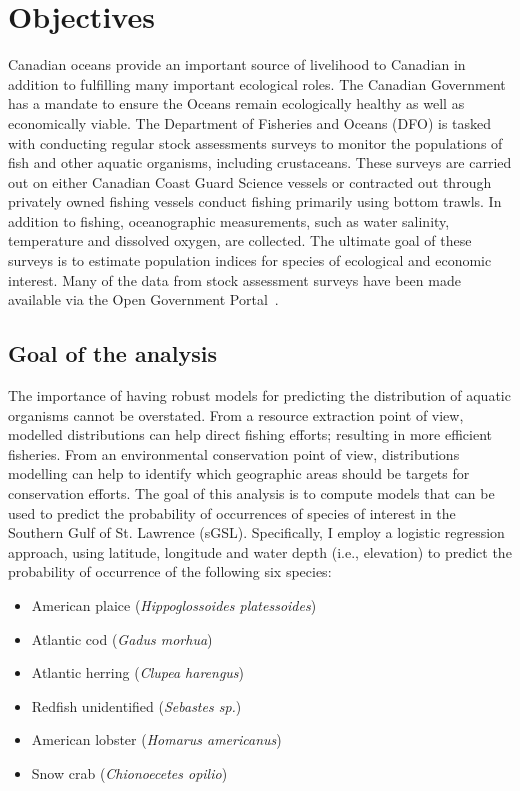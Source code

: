 \section{Objectives}

Canadian oceans provide an important source of livelihood to Canadian in addition to fulfilling many important ecological roles.
The Canadian Government has a mandate to ensure the Oceans remain ecologically healthy as well as economically viable.
The Department of Fisheries and Oceans (DFO) is tasked with conducting regular stock assessments surveys to monitor the populations of fish and other aquatic
organisms, including crustaceans.
These surveys are carried out on either Canadian Coast Guard Science vessels or contracted out through privately owned fishing vessels conduct fishing
primarily using bottom trawls. In addition to fishing, oceanographic measurements, such as water salinity, temperature and dissolved oxygen, are collected.
The ultimate goal of these surveys is to estimate population indices for species of ecological and economic interest.
Many of the data from stock assessment surveys have been made available via the Open Government Portal~\cite{ogp}.

\subsection{Goal of the analysis}

The importance of having robust models for predicting the distribution of aquatic organisms cannot be overstated.
From a resource extraction point of view, modelled distributions can help direct fishing efforts; resulting in more efficient fisheries.
From an environmental conservation point of view, distributions modelling can help to identify which geographic areas should be targets for
conservation efforts.
The goal of this analysis is to compute models that can be used to predict the probability of occurrences of species of interest in the Southern
Gulf of St. Lawrence (sGSL).
Specifically, I employ a logistic regression approach, using latitude, longitude and water depth (i.e., elevation) to predict the probability of
occurrence of the following six species:

\begin{itemize}
    \item American plaice (\textit{Hippoglossoides platessoides})
    \item Atlantic cod (\textit{Gadus morhua})
    \item Atlantic herring (\textit{Clupea harengus})
    \item Redfish unidentified (\textit{Sebastes sp.})
    \item American lobster (\textit{Homarus americanus})
    \item Snow crab (\textit{Chionoecetes opilio})
\end{itemize}

